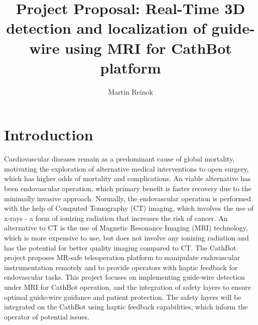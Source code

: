 \documentclass{article}
\title{Project Proposal: Real-Time 3D detection and localization of guide-wire using MRI for CathBot platform }
\author{Martin Reinok}
\begin{document}
\maketitle

\section{Introduction}
Cardiovascular diseases remain as a predominant cause of global mortality, motivating the exploration of alternative medical interventions to open surgery, which has higher odds of mortality and complications. An viable alternative has been endovascular operation, which primary benefit is faster recovery due to the minimally invasive approach. Normally, the endovascular operation is performed with the help of Computed Tomography (CT) imaging, which involves the use of x-rays - a form of ionizing radiation that increases the risk of cancer. An alternative to CT is the use of Magnetic Resonance Imaging (MRI) technology, which is more expensive to use, but does not involve any ionizing radiation and has the potential for better quality imaging compared to CT. The CathBot project \cite{cathbot} proposes MR-safe teleoperation platform to manipulate endovascular instrumentation remotely and to provide operators with haptic feedback for endovascular tasks. This project focuses on implementing guide-wire detection under MRI for CathBot operation, and the integration of safety layers to ensure optimal guide-wire guidance and patient protection. The safety layers will be integrated on the CathBot using haptic feedback capabilities, which inform the operator of potential issues.

\end{document}
